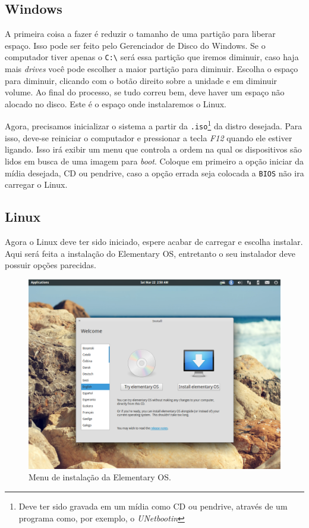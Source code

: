 \documentclass{handout_utfpr}
\begin{document}
\subsection{Windows}
A primeira coisa a fazer é reduzir o tamanho de uma partição para liberar espaço. Isso pode ser feito pelo Gerenciador de Disco do Windows. Se o computador tiver apenas o \texttt{C:\textbackslash} será essa partição que iremos diminuir, caso haja mais \emph{drives} você pode escolher a maior partição para diminuir. Escolha o espaço para diminuir, clicando com o botão direito sobre a unidade e em diminuir volume. Ao final do processo, se tudo correu bem, deve haver um espaço não alocado no disco. Este é o espaço onde instalaremos o Linux.

Agora, precisamos inicializar o sistema a partir da \texttt{.iso}\footnote{Deve ter sido gravada em um mídia como CD ou pendrive, através de um programa como, por exemplo, o \emph{UNetbootin}} da distro desejada. Para isso, deve-se reiniciar o computador e pressionar a tecla \emph{F12} quando ele estiver ligando. Isso irá exibir um menu que controla a ordem na qual os dispositivos são lidos em busca de uma imagem para \textit{boot}. Coloque em primeiro a opção iniciar da mídia desejada, CD ou pendrive, caso a opção errada seja colocada a \texttt{BIOS} não ira carregar o Linux.

\subsection{Linux}
Agora o Linux deve ter sido iniciado, espere acabar de carregar e escolha instalar. Aqui será feita a instalação do Elementary OS, entretanto o seu instalador deve possuir opções parecidas.

\begin{figure}[h]
  \centering
  \includegraphics[scale=.31]{imagens/elementary-install-01.png}
  \caption{Menu de instalação da Elementary OS\@.}
  \label{fig:elementary-menu}
\end{figure}
\end{document}
